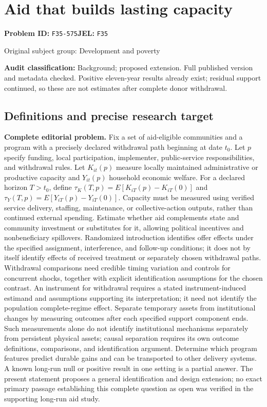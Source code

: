 \documentclass[11pt,a4paper]{article}
\begin{document}
\section*{Aid that builds lasting capacity}
\textbf{Problem ID:} \texttt{F35-575}\quad \textbf{JEL:} \texttt{F35}\par
\label{problem:OP-0375}
{\sffamily\small\color{muted}Original subject group: Development and poverty\par}
\label{definitions:problem:30007657}
\textbf{Audit classification:} Background; proposed extension. Full published version and metadata checked. Positive eleven-year results already exist; residual support continued, so these are not estimates after complete donor withdrawal.
\subsection*{Definitions and precise research target}
\textbf{Complete editorial problem.} Fix a set of aid-eligible communities and a program with a precisely declared withdrawal path beginning at date \(t_0\). Let \(p\) specify funding, local participation, implementer, public-service responsibilities, and withdrawal rules. Let \(K_{it}(p)\) measure locally maintained administrative or productive capacity and \(Y_{it}(p)\) household economic welfare. For a declared horizon \(T>t_0\), define \(\tau_K(T,p)=E[K_{iT}(p)-K_{iT}(0)]\) and \(\tau_Y(T,p)=E[Y_{iT}(p)-Y_{iT}(0)]\). Capacity must be measured using verified service delivery, staffing, maintenance, or collective-action outputs, rather than continued external spending. Estimate whether aid complements state and community investment or substitutes for it, allowing political incentives and nonbeneficiary spillovers. Randomized introduction identifies offer effects under the specified assignment, interference, and follow-up conditions; it does not by itself identify effects of received treatment or separately chosen withdrawal paths. Withdrawal comparisons need credible timing variation and controls for concurrent shocks, together with explicit identification assumptions for the chosen contrast. An instrument for withdrawal requires a stated instrument-induced estimand and assumptions supporting its interpretation; it need not identify the population complete-regime effect. Separate temporary assets from institutional changes by measuring outcomes after each specified support component ends. Such measurements alone do not identify institutional mechanisms separately from persistent physical assets; causal separation requires its own outcome definitions, comparisons, and identification argument. Determine which program features predict durable gains and can be transported to other delivery systems. A known long-run null or positive result in one setting is a partial answer. The present statement proposes a general identification and design extension; no exact primary passage establishing this complete question as open was verified in the supporting long-run aid study.
\end{document}
